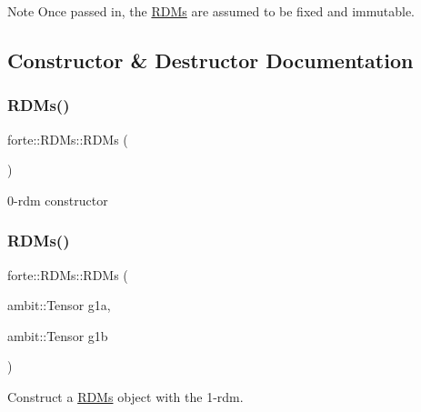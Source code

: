 \begin{DoxyNote}{Note}
Once passed in, the \mbox{\hyperlink{classforte_1_1_r_d_ms}{R\+D\+Ms}} are assumed to be fixed and immutable. 
\end{DoxyNote}


\subsection{Constructor \& Destructor Documentation}
\mbox{\label{classforte_1_1_r_d_ms_a66632414857a05a11ee59057112d7886}} 
\subsubsection{\texorpdfstring{R\+D\+Ms()}{RDMs()}\hspace{0.1cm}{\footnotesize\ttfamily [1/7]}}
{\footnotesize\ttfamily forte\+::\+R\+D\+Ms\+::\+R\+D\+Ms (\begin{DoxyParamCaption}{ }\end{DoxyParamCaption})}



0-\/rdm constructor 

\mbox{\label{classforte_1_1_r_d_ms_ae7fd52d5cd4057aa5f3a62d66e508d72}} 
\subsubsection{\texorpdfstring{R\+D\+Ms()}{RDMs()}\hspace{0.1cm}{\footnotesize\ttfamily [2/7]}}
{\footnotesize\ttfamily forte\+::\+R\+D\+Ms\+::\+R\+D\+Ms (\begin{DoxyParamCaption}\item[{ambit\+::\+Tensor}]{g1a,  }\item[{ambit\+::\+Tensor}]{g1b }\end{DoxyParamCaption})}



Construct a \mbox{\hyperlink{classforte_1_1_r_d_ms}{R\+D\+Ms}} object with the 1-\/rdm. 

\mbox{\label{classforte_1_1_r_d_ms_a0b94a7646ff854c5a6dac171ea7ec3f0}} 
